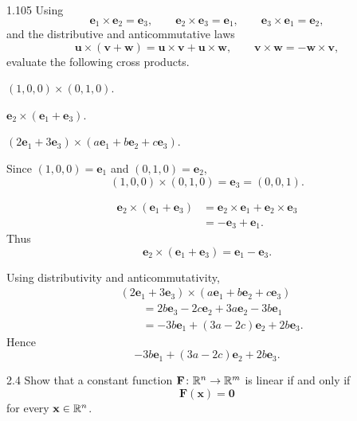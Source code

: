 \documentclass[11pt,oneside]{article}
\begin{document}
\begin{problem}{1.105}
Using
\[
    \mathbf e_1\times\mathbf e_2=\mathbf e_3,
    \qquad
    \mathbf e_2\times\mathbf e_3=\mathbf e_1,
    \qquad
    \mathbf e_3\times\mathbf e_1=\mathbf e_2,
\]
and the distributive and anticommutative laws
\[
    \mathbf u\times(\mathbf v+\mathbf w)
    =\mathbf u\times\mathbf v+\mathbf u\times\mathbf w,
    \qquad
    \mathbf v\times\mathbf w=-\mathbf w\times\mathbf v,
\]
evaluate the following cross products.
\begin{problemsubparts}
    \item $(1,0,0)\times(0,1,0)$.
    \item $\mathbf e_2\times(\mathbf e_1+\mathbf e_3)$.
    \item $(2\mathbf e_1+3\mathbf e_3)\times(a\mathbf e_1+b\mathbf e_2+c\mathbf e_3)$.
\end{problemsubparts}
\end{problem}

\begin{solution}
\begin{problemsubparts}
    \item Since $(1,0,0)=\mathbf e_1$ and $(0,1,0)=\mathbf e_2$,
    \[
        \boxed{(1,0,0)\times(0,1,0)=\mathbf e_3=(0,0,1)}.
    \]
    \item
    \begin{align*}
        \mathbf e_2\times(\mathbf e_1+\mathbf e_3)
        &=\mathbf e_2\times\mathbf e_1+\mathbf e_2\times\mathbf e_3\\
        &=-\mathbf e_3+\mathbf e_1.
    \end{align*}
    Thus
    \[
        \boxed{\mathbf e_2\times(\mathbf e_1+\mathbf e_3)=\mathbf e_1-\mathbf e_3}.
    \]
    \item Using distributivity and anticommutativity,
    \begin{align*}
        &(2\mathbf e_1+3\mathbf e_3)\times(a\mathbf e_1+b\mathbf e_2+c\mathbf e_3)\\
        &\qquad=2b\mathbf e_3-2c\mathbf e_2+3a\mathbf e_2-3b\mathbf e_1\\
        &\qquad=-3b\mathbf e_1+(3a-2c)\mathbf e_2+2b\mathbf e_3.
    \end{align*}
    Hence
    \[
        \boxed{-3b\mathbf e_1+(3a-2c)\mathbf e_2+2b\mathbf e_3}.
    \]
\end{problemsubparts}
\end{solution}

\begin{problem}{2.4}
Show that a constant function $\mathbf F\colon\mathbb{R}^n\to\mathbb{R}^m$ is linear if and only if
\[
    \mathbf F(\mathbf x)=\mathbf 0
\]
for every $\mathbf x\in\mathbb{R}^n$.
\end{problem}
\end{document}
